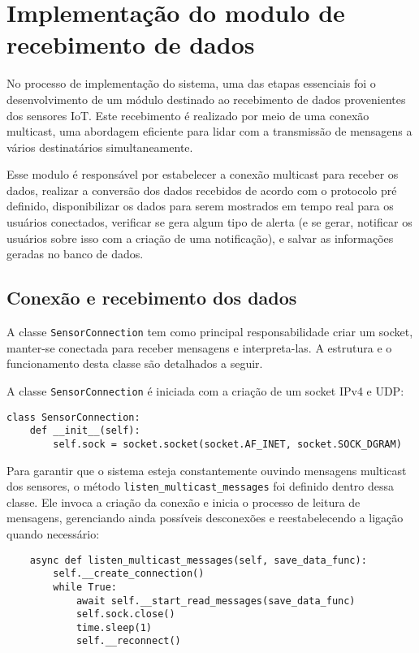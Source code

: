 \section{Implementação do modulo de recebimento de dados}\label{sec:Implementação do modulo de recebimento de dados}

No processo de implementação do sistema, uma das etapas essenciais foi o desenvolvimento de um módulo destinado ao recebimento de dados provenientes dos sensores IoT. Este recebimento é realizado por meio de uma conexão multicast, uma abordagem eficiente para lidar com a transmissão de mensagens a vários destinatários simultaneamente.

Esse modulo é responsável por estabelecer a conexão multicast para receber os dados, realizar a conversão dos dados recebidos de acordo com o protocolo pré definido, disponibilizar os dados para serem mostrados em tempo real para os usuários conectados, verificar se gera algum tipo de alerta (e se gerar, notificar os usuários sobre isso com a criação de uma notificação), e salvar as informações geradas no banco de dados.

\subsection[Conexão e recebimento dos dados]{Conexão e recebimento dos dados}\label{subsec:Conexão e recebimento dos dados}

A classe \texttt{SensorConnection} tem como principal responsabilidade criar um socket, manter-se conectada para receber mensagens e interpreta-las. A estrutura e o funcionamento desta classe são detalhados a seguir.

A classe \texttt{SensorConnection} é iniciada com a criação de um socket IPv4 e UDP:

\begin{verbatim}
class SensorConnection:
    def __init__(self):
        self.sock = socket.socket(socket.AF_INET, socket.SOCK_DGRAM)
\end{verbatim}

Para garantir que o sistema esteja constantemente ouvindo mensagens multicast dos sensores, o método \texttt{listen\_multicast\_messages} foi definido dentro dessa classe. Ele invoca a criação da conexão e inicia o processo de leitura de mensagens, gerenciando ainda possíveis desconexões e reestabelecendo a ligação quando necessário:

\begin{verbatim}
    async def listen_multicast_messages(self, save_data_func):
        self.__create_connection()
        while True:
            await self.__start_read_messages(save_data_func)
            self.sock.close()
            time.sleep(1)
            self.__reconnect()
\end{verbatim}

